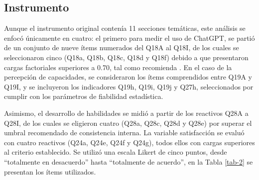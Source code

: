 \documentclass[spanish]{textolivre}
\begin{document}
\subsection{Instrumento}
Aunque el instrumento original contenía 11 secciones temáticas, este análisis se enfocó únicamente en cuatro: el primero para medir el uso de ChatGPT, se partió de un conjunto de nueve ítems numerados del Q18A al Q18I, de los cuales se seleccionaron cinco (Q18a, Q18b, Q18c, Q18d y Q18f) debido a que presentaron cargas factoriales superiores a 0.70, tal como recomienda \cite{hair2019}. En el caso de la percepción de capacidades, se consideraron los ítems comprendidos entre Q19A y Q19I, y se incluyeron los indicadores Q19h, Q19i, Q19j y Q27h, seleccionados por cumplir con los parámetros de fiabilidad estadística. 

Asimismo, el desarrollo de habilidades se midió a partir de los reactivos Q28A a Q28I, de los cuales se eligieron cuatro (Q28a, Q28c, Q28d y Q28e) por superar el umbral recomendado de consistencia interna. La variable satisfacción se evaluó con cuatro reactivos (Q24a, Q24e, Q24f y Q24g), todos ellos con cargas superiores al criterio establecido. Se utilizó una escala Likert de cinco puntos, desde ``totalmente en desacuerdo'' hasta ``totalmente de acuerdo'', en la Tabla \ref{tab-2} se presentan los ítems utilizados.
\end{document}
